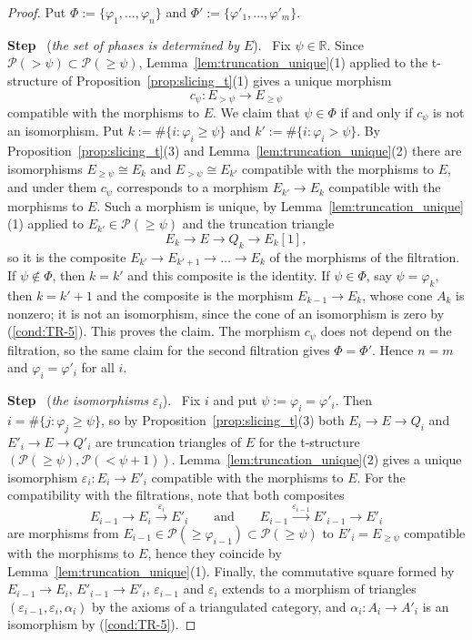 \documentclass[12pt]{amsart}
\newcommand{\condref}[1]{\textup{(\ref{#1})}}
\numberwithin{theorem}{section}
\theoremstyle{definition}
\newcounter{pstep}
\newcommand{\step}[1]{\par\medskip\noindent\refstepcounter{pstep}\textbf{Step \thepstep}\ (\textit{#1}).\ \ignorespaces}
\newcommand{\RR}{\mathbb{R}}
\newcommand{\calP}{\mathcal{P}}
\begin{document}
	\begin{proof}
		Put $\Phi := \{ \varphi_1, \ldots, \varphi_n \}$ and $\Phi' := \{ \varphi'_1, \ldots, \varphi'_m \}$.

		\step{the set of phases is determined by $E$}
		Fix $\psi \in \RR$.
		Since $\calP(> \psi) \subset \calP(\geqslant \psi)$, Lemma~\ref{lem:truncation_unique}(1) applied to the t-structure of Proposition~\ref{prop:slicing_t}(1) gives a unique morphism
		\[
		c_\psi \colon E_{> \psi} \longrightarrow E_{\geqslant \psi}
		\]
		compatible with the morphisms to $E$.
		We claim that $\psi \in \Phi$ if and only if $c_\psi$ is not an isomorphism.
		Put $k := \# \{ i : \varphi_i \geqslant \psi \}$ and $k' := \# \{ i : \varphi_i > \psi \}$.
		By Proposition~\ref{prop:slicing_t}(3) and Lemma~\ref{lem:truncation_unique}(2) there are isomorphisms $E_{\geqslant \psi} \cong E_k$ and $E_{> \psi} \cong E_{k'}$ compatible with the morphisms to $E$, and under them $c_\psi$ corresponds to a morphism $E_{k'} \to E_k$ compatible with the morphisms to $E$.
		Such a morphism is unique, by Lemma~\ref{lem:truncation_unique}(1) applied to $E_{k'} \in \calP(\geqslant \psi)$ and the truncation triangle 
		\[
		E_k \to E \to Q_k \to E_k[1],
		\]
		so it is the composite $E_{k'} \to E_{k'+1} \to \ldots \to E_k$ of the morphisms of the filtration.
		If $\psi \notin \Phi$, then $k = k'$ and this composite is the identity.
		If $\psi \in \Phi$, say $\psi = \varphi_k$, then $k = k' + 1$ and the composite is the morphism $E_{k-1} \to E_k$, whose cone $A_k$ is nonzero;
		it is not an isomorphism, since the cone of an isomorphism is zero by \condref{cond:TR-5}.
		This proves the claim.
		The morphism $c_\psi$ does not depend on the filtration, so the same claim for the second filtration gives $\Phi = \Phi'$.
		Hence $n = m$ and $\varphi_i = \varphi'_i$ for all $i$.

		\step{the isomorphisms $\varepsilon_i$}
		Fix $i$ and put $\psi := \varphi_i = \varphi'_i$.
		Then $i = \# \{ j : \varphi_j \geqslant \psi \}$, so by Proposition~\ref{prop:slicing_t}(3) both $E_i \to E \to Q_i$ and $E'_i \to E \to Q'_i$ are truncation triangles of $E$ for the t-structure $(\calP(\geqslant \psi), \calP(< \psi + 1))$.
		Lemma~\ref{lem:truncation_unique}(2) gives a unique isomorphism $\varepsilon_i \colon E_i \to E'_i$ compatible with the morphisms to $E$.
		For the compatibility with the filtrations, note that both composites
		\[
		E_{i-1} \to E_i \xrightarrow{\varepsilon_i} E'_i
		\qquad\text{and}\qquad
		E_{i-1} \xrightarrow{\varepsilon_{i-1}} E'_{i-1} \to E'_i
		\]
		are morphisms from $E_{i-1} \in \calP(\geqslant \varphi_{i-1}) \subset \calP(\geqslant \psi)$ to $E'_i = E_{\geqslant \psi}$ compatible with the morphisms to $E$, hence they coincide by Lemma~\ref{lem:truncation_unique}(1).
		Finally, the commutative square formed by $E_{i-1} \to E_i$, $E'_{i-1} \to E'_i$, $\varepsilon_{i-1}$ and $\varepsilon_i$ extends to a morphism of triangles $(\varepsilon_{i-1}, \varepsilon_i, \alpha_i)$ by the axioms of a triangulated category, and $\alpha_i \colon A_i \to A'_i$ is an isomorphism by \condref{cond:TR-5}.
	\end{proof}
\end{document}
